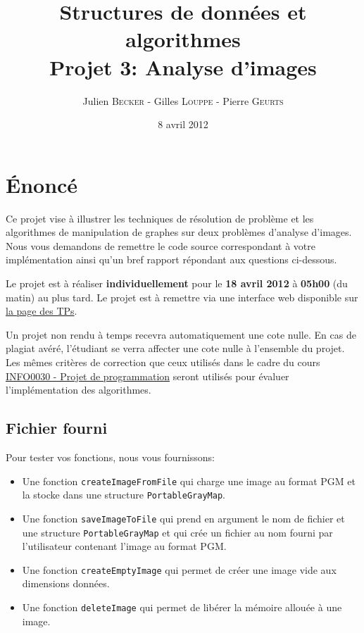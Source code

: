 \documentclass[a4paper,10pt]{article}
\title{
    \textbf{Structures de données et algorithmes}\\
    Projet 3: Analyse d'images
}
\author{Julien \textsc{Becker} - Gilles \textsc{Louppe} - Pierre \textsc{Geurts}}
\date{8 avril 2012}
\begin{document}
\maketitle

\section*{\'Enoncé}

Ce projet vise à illustrer les techniques de résolution de problème et
les algorithmes de manipulation de graphes sur deux problèmes
d'analyse d'images. Nous vous demandons de remettre le code source
correspondant à votre implémentation ainsi qu'un bref rapport
répondant aux questions ci-dessous.

Le projet est à réaliser {\bf individuellement} pour le {\bf 18 avril
  2012} à {\bf 05h00} (du matin) au plus tard. Le projet est à
remettre via une interface web disponible sur
\href{http://www.montefiore.ulg.ac.be/~glouppe/2011-2012/students.info0902.php}{la
  page des TPs}.

Un projet non rendu à temps recevra automatiquement une cote nulle. En
cas de plagiat avéré, l'étudiant se verra affecter une cote nulle à
l'ensemble du projet. Les mêmes critères de correction que ceux
utilisés dans le cadre du cours
\href{http://www.montefiore.ulg.ac.be/~info0030/}{INFO0030 - Projet de
  programmation} seront utilisés pour évaluer l'implémentation des
algorithmes.

\subsection*{Fichier fourni}

Pour tester vos fonctions, nous vous fournissons:
\begin{itemize}
\item Une fonction \texttt{createImageFromFile} qui charge une image au format PGM et la stocke dans une structure \texttt{PortableGrayMap}.
\item Une fonction \texttt{saveImageToFile} qui prend en argument le nom de fichier et une structure \texttt{PortableGrayMap} et qui crée un fichier au nom fourni par l'utilisateur contenant l'image au format PGM.
\item Une fonction \texttt{createEmptyImage} qui permet de créer une image vide aux dimensions données.
\item Une fonction \texttt{deleteImage} qui permet de libérer la mémoire allouée à une image.
\end{itemize}
\end{document}

